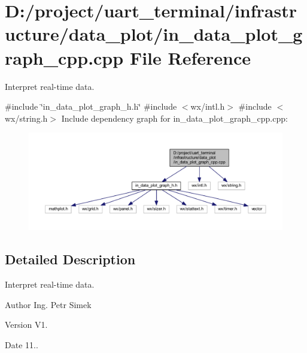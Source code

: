 \section{D\+:/project/uart\+\_\+terminal/infrastructure/data\+\_\+plot/in\+\_\+data\+\_\+plot\+\_\+graph\+\_\+cpp.cpp File Reference}
\label{in__data__plot__graph__cpp_8cpp}


Interpret real-\/time data.  


{\ttfamily \#include \char`\"{}in\+\_\+data\+\_\+plot\+\_\+graph\+\_\+h.\+h\char`\"{}}\newline
{\ttfamily \#include $<$wx/intl.\+h$>$}\newline
{\ttfamily \#include $<$wx/string.\+h$>$}\newline
Include dependency graph for in\+\_\+data\+\_\+plot\+\_\+graph\+\_\+cpp.\+cpp\+:\nopagebreak
\begin{figure}[H]
\begin{center}
\leavevmode
\includegraphics[width=350pt]{in__data__plot__graph__cpp_8cpp__incl}
\end{center}
\end{figure}


\subsection{Detailed Description}
Interpret real-\/time data. 

\begin{DoxyAuthor}{Author}
Ing. Petr Simek 
\end{DoxyAuthor}
\begin{DoxyVersion}{Version}
V1. 
\end{DoxyVersion}
\begin{DoxyDate}{Date}
11.. 
\end{DoxyDate}
